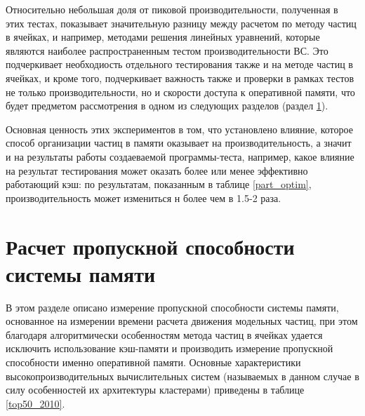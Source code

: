 Относительно небольшая доля от пиковой производительности, полученная в этих тестах, показывает значительную разницу между расчетом по методу частиц в ячейках, и например, методами решения линейных уравнений, которые являются наиболее распространенным тестом производительности ВС. Это подчеркивает необходиость отдельного тестирования также и на методе частиц в ячейках, и кроме того, подчеркивает важность также и проверки в рамках тестов не только производительности, но и скорости доступа к оперативной памяти, что будет предметом рассмотрения в одном из следующих разделов (раздел \ref{perfRAM}). 

Основная ценность этих экспериментов в том, что установлено влияние, которое способ организации частиц в памяти оказывает на производительность, а значит и на результаты работы создаеваемой программы-теста, например, какое влияние на результат тестирования может оказать более или менее эффективно работающий кэш: по результатам, показанным в таблице \ref{part_optim}, производительность может измениться н более чем в 1.5-2 раза.


\section{Расчет пропускной способности системы памяти}
\label{perfRAM}
В этом разделе описано измерение пропускной способности системы памяти, основанное на измерении времени расчета движения модельных частиц, при этом благодаря алгоритмически особенностям метода частиц в ячейках удается исключить использование кэш-памяти и производить измерение пропускной способности именно оперативной памяти. Основные характеристики высокопроизводительных вычислительных систем (называемых в данном случае в силу особенностей их архитектуры кластерами) приведены в таблице \ref{top50_2010}.

